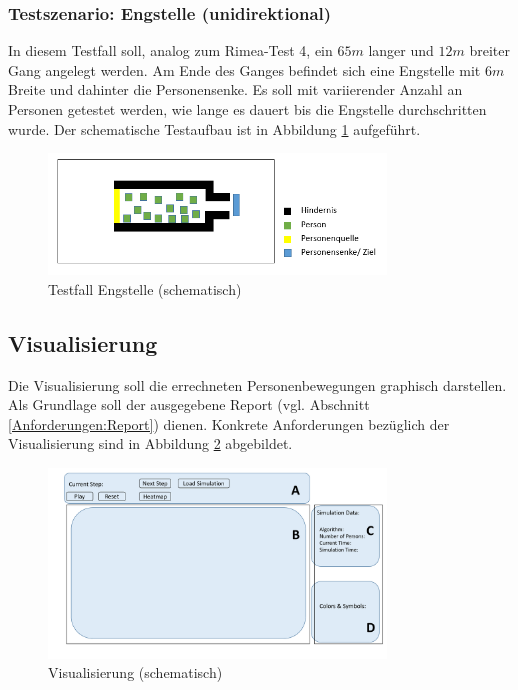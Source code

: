 \subsubsection{Testszenario: Engstelle (unidirektional)}
In diesem Testfall soll, analog zum Rimea-Test 4, ein $65m$ langer und $12m$ breiter Gang angelegt werden. Am Ende des Ganges befindet sich eine Engstelle mit $6m$ Breite und dahinter die Personensenke. Es soll mit variierender Anzahl an Personen getestet werden, wie lange es dauert bis die Engstelle durchschritten wurde. Der schematische Testaufbau ist in Abbildung \ref{fig:Engstelle} aufgeführt.

\begin{figure}[htpb]
	\centering
	\includegraphics[width=0.8\textwidth]{abbildungen/Test_Engstelle.png}
	\caption{Testfall Engstelle (schematisch)}
	\label{fig:Engstelle}
\end{figure}

\subsection{Visualisierung}
Die Visualisierung soll die errechneten Personenbewegungen graphisch darstellen. Als Grundlage soll der ausgegebene Report (vgl. Abschnitt \ref{Anforderungen:Report}) dienen. Konkrete Anforderungen bezüglich der Visualisierung sind in Abbildung \ref{fig:AnforderungenVisualisierung} abgebildet.

\begin{figure}[htpb]
	\centering
	\includegraphics[width=0.8\textwidth]{abbildungen/AnforderungenVisualisierung.pdf}
	\caption{Visualisierung (schematisch)}
	\label{fig:AnforderungenVisualisierung}
\end{figure}

